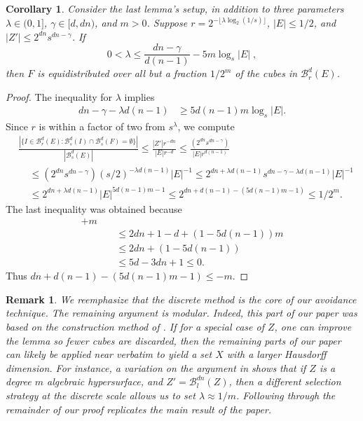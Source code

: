 \documentclass[usenames,dvipsnames]{article}
\theoremstyle{plain}
\newtheorem{corollary}{Corollary}
\theoremstyle{plain}
\newtheorem*{remark}{Remark}
\begin{document}
\begin{corollary}
	Consider the last lemma's setup, in addition to three parameters $\lambda \in (0,1]$, $\gamma \in [d,dn)$, and $m > 0$. Suppose $r = 2^{- \lfloor \lambda \log_2(1/s) \rfloor}$, $|E| \leq 1/2$, and $|Z'| \leq 2^{dn} s^{dn-\gamma}$. If
	\[ 0 < \lambda \leq \frac{dn - \gamma}{d(n-1)} - 5 m \log_s |E|\; , \]
	then $F$ is equidistributed over all but a fraction $1/2^m$ of the cubes in $\mathcal{B}^d_r(E)$.
\end{corollary}
\begin{proof}
	The inequality for $\lambda$ implies
	\begin{align*}
		dn - \gamma - \lambda d(n-1) &\geq 5d(n-1) m \log_s |E|.
	\end{align*}
	Since $r$ is within a factor of two from $s^\lambda$, we compute
	\begin{align*}
		&\frac{|\{ I \in \mathcal{B}^d_r(E): \mathcal{B}^d_s(I) \cap \mathcal{B}^d_s(F) = \emptyset \}|}{|\mathcal{B}^d_s(E)|} \leq \frac{|Z'| r^{-dn}}{|E|r^{-d}} \leq \frac{(2^{dn} s^{dn - \gamma})}{|E| r^{d(n-1)}}\\
		&\ \ \ \ \ \leq (2^{dn} s^{dn - \gamma}) (s/2)^{- \lambda d(n-1)} |E|^{-1} \leq 2^{dn + \lambda d(n-1)} s^{dn - \gamma - \lambda d(n-1)} |E|^{-1} \\
		&\ \ \ \ \ \leq 2^{dn + \lambda d(n-1)} |E|^{5d(n-1)m - 1} \leq 2^{dn + d(n-1) - (5d(n-1)m - 1)} \leq 1/2^m.
	\end{align*}
	The last inequality was obtained because
	\begin{align*}
		[dn + &d(n-1) - (5d(n-1)m - 1)] + m\\
		&\ \ \ \ \ \leq 2dn + 1 - d + (1 - 5d(n-1)) m\\
		&\ \ \ \ \ \leq 2dn + (1 - 5d(n-1))\\
		&\ \ \ \ \ \leq 5d-3dn + 1 \leq 0.
	\end{align*}
	Thus $dn + d(n-1) - (5d(n-1)m - 1) \leq -m$.
\end{proof}

\begin{remark}
	We reemphasize that the discrete method is the core of our avoidance technique. The remaining argument is modular. Indeed, this part of our paper was based on the construction method of \cite{MalabikaRob}. If for a special case of $Z$, one can improve the lemma so fewer cubes are discarded, then the remaining parts of our paper can likely be applied near verbatim to yield a set $X$ with a larger Hausdorff dimension. For instance, a variation on the argument in \cite{Mathe} shows that if $Z$ is a degree $m$ algebraic hypersurface, and $Z' = \mathcal{B}^{dn}_l(Z)$, then a different selection strategy at the discrete scale allows us to set $\lambda \approx 1/m$. Following through the remainder of our proof replicates the main result of the paper.
\end{remark}
\end{document}
